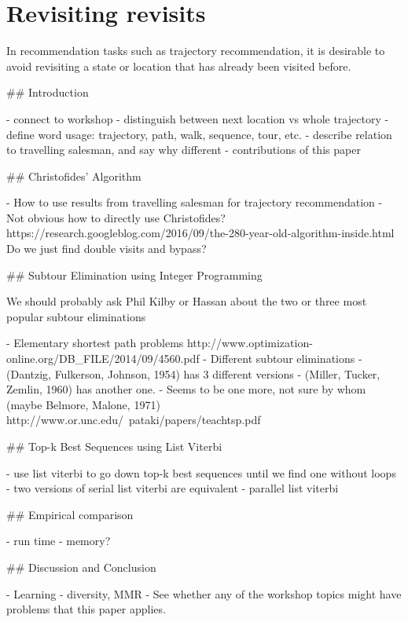 \section{Revisiting revisits}

In recommendation tasks such as trajectory recommendation, it is desirable to avoid revisiting
a state or location that has already been visited before.

## Introduction

- connect to workshop
- distinguish between next location vs whole trajectory
- define word usage: trajectory, path, walk, sequence, tour, etc.
- describe relation to travelling salesman, and say why different
- contributions of this paper

## Christofides' Algorithm

- How to use results from travelling salesman for trajectory recommendation
- Not obvious how to directly use Christofides?
  https://research.googleblog.com/2016/09/the-280-year-old-algorithm-inside.html
  Do we just find double visits and bypass?

## Subtour Elimination using Integer Programming

We should probably ask Phil Kilby or Hassan about the two or three most popular subtour eliminations

- Elementary shortest path problems
  http://www.optimization-online.org/DB_FILE/2014/09/4560.pdf
- Different subtour eliminations
  - (Dantzig, Fulkerson, Johnson, 1954) has 3 different versions
  - (Miller, Tucker, Zemlin, 1960) has another one.
  - Seems to be one more, not sure by whom (maybe Belmore, Malone, 1971)
  http://www.or.unc.edu/~pataki/papers/teachtsp.pdf


## Top-k Best Sequences using List Viterbi

- use list viterbi to go down top-k best sequences until we find one without loops
- two versions of serial list viterbi are equivalent
- parallel list viterbi

## Empirical comparison

- run time
- memory?

## Discussion and Conclusion

- Learning
- diversity, MMR
- See whether any of the workshop topics might have problems that this paper applies.
